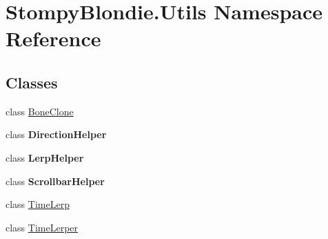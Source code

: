 \hypertarget{namespace_stompy_blondie_1_1_utils}{}\section{Stompy\+Blondie.\+Utils Namespace Reference}
\label{namespace_stompy_blondie_1_1_utils}
\subsection*{Classes}
\begin{DoxyCompactItemize}
\item 
class \mbox{\hyperlink{class_stompy_blondie_1_1_utils_1_1_bone_clone}{Bone\+Clone}}
\item 
class {\bfseries Direction\+Helper}
\item 
class {\bfseries Lerp\+Helper}
\item 
class {\bfseries Scrollbar\+Helper}
\item 
class \mbox{\hyperlink{class_stompy_blondie_1_1_utils_1_1_time_lerp}{Time\+Lerp}}
\item 
class \mbox{\hyperlink{class_stompy_blondie_1_1_utils_1_1_time_lerper}{Time\+Lerper}}
\end{DoxyCompactItemize}
